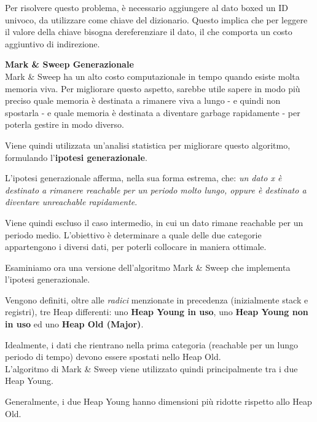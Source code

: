 \documentclass{article}
\begin{document}
Per risolvere questo problema, è necessario aggiungere al dato boxed un ID univoco, da utilizzare come chiave del dizionario. Questo implica che per leggere il valore della chiave bisogna dereferenziare il dato, il che comporta un costo aggiuntivo di indirezione.

\vspace{14pt}
\textbf{Mark \& Sweep Generazionale}\\
Mark \& Sweep ha un alto costo computazionale in tempo quando esiste molta memoria viva. Per migliorare questo aspetto, sarebbe utile sapere in modo più preciso quale memoria è destinata a rimanere viva a lungo - e quindi non spostarla - e quale memoria è destinata a diventare garbage rapidamente - per poterla gestire in modo diverso.

Viene quindi utilizzata un'analisi statistica per migliorare questo algoritmo, formulando l'\textbf{ipotesi generazionale}. 

L'ipotesi generazionale afferma, nella sua forma estrema, che: \textit{un dato x è destinato a rimanere reachable per un periodo molto lungo, oppure è destinato a diventare unreachable rapidamente}.

Viene quindi escluso il caso intermedio, in cui un dato rimane reachable per un periodo medio. L'obiettivo è determinare a quale delle due categorie appartengono i diversi dati, per poterli collocare in maniera ottimale.

Esaminiamo ora una versione dell'algoritmo Mark \& Sweep che implementa l'ipotesi generazionale.

Vengono definiti, oltre alle \textit{radici} menzionate in precedenza (inizialmente stack e registri), tre Heap differenti: uno \textbf{Heap Young in uso}, uno \textbf{Heap Young non in uso} ed uno \textbf{Heap Old (Major)}.

Idealmente, i dati che rientrano nella prima categoria (reachable per un lungo periodo di tempo) devono essere spostati nello Heap Old.\\
L'algoritmo di Mark \& Sweep viene utilizzato quindi principalmente tra i due Heap Young.

Generalmente, i due Heap Young hanno dimensioni più ridotte rispetto allo Heap Old.
\end{document}
